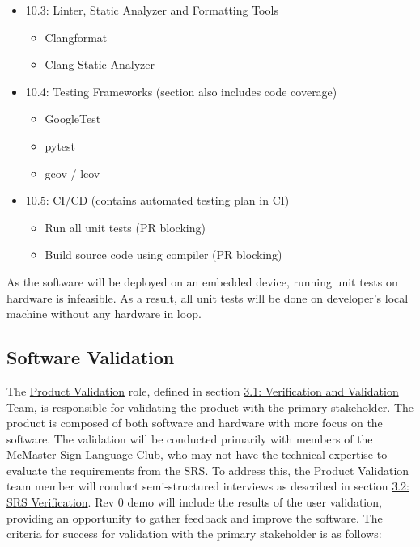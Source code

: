 \documentclass[12pt, titlepage]{article}
\begin{document}
\begin{itemize}
  \item 10.3: Linter, Static Analyzer and Formatting Tools
  \begin{itemize}
    \item Clangformat \cite{ClangFormat}
    \item Clang Static Analyzer \cite{clangStaticAnalyzer}
  \end{itemize}
  \item 10.4: Testing Frameworks (section also includes code coverage)
  \begin{itemize}
    \item GoogleTest \cite{GoogleTest}
    \item pytest \cite{pytest}
    \item gcov \cite{gcov} / lcov \cite{lcov}
  \end{itemize}
  \item 10.5: CI/CD (contains automated testing plan in CI)
  \begin{itemize}
    \item Run all unit tests (PR blocking)
    \item Build source code using compiler (PR blocking)
  \end{itemize}
\end{itemize}

As the software will be deployed on an embedded device, running unit tests on
hardware is infeasible. As a result, all unit tests will be done on developer's
local machine without any hardware in loop.

\subsection{Software Validation}\label{sec:software_validation}

The \hyperref[role:product_validation]{Product Validation} role, defined in
section \hyperref[sec:vnv_team]{3.1: Verification and Validation Team}, is
responsible for validating the product with the primary stakeholder. The product
is composed of both software and hardware with more focus on the software. The
validation will be conducted primarily with members of the McMaster Sign
Language Club, who may not have the technical expertise to evaluate the
requirements from the SRS. To address this, the Product Validation team member
will conduct semi-structured interviews as described in section
\hyperref[sec:srs_verification]{3.2: SRS Verification}. Rev 0 demo will include
the results of the user validation, providing an opportunity to gather feedback
and improve the software.
\newline
\newline
The criteria for success for validation with the primary stakeholder is as
follows:
\end{document}
